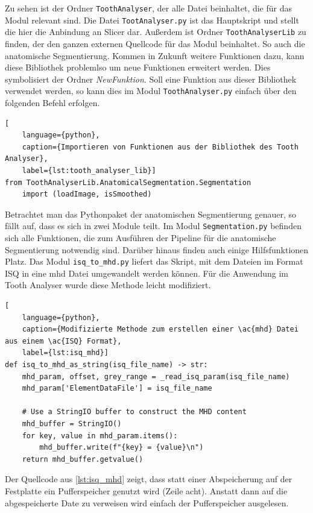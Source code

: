 Zu sehen ist der Ordner \texttt{ToothAnalyser}, der alle Datei beinhaltet, die
für das Modul relevant sind. Die Datei \texttt{TootAnalyser.py} ist das
Hauptskript und stellt die hier die Anbindung an Slicer dar. Außerdem ist Ordner
\texttt{ToothAnalyserLib} zu finden, der den ganzen externen Quellcode für das Modul
beinhaltet. So auch die anatomische Segmentierung. Kommen in Zukunft weitere Funktionen
dazu, kann diese Bibliothek problemlso um neue Funktionen erweitert werden. Dies
symbolisiert der Ordner \textsl{NewFunktion}. Soll eine Funktion aus dieser Bibliothek
verwendet werden, so kann dies im Modul \texttt{ToothAnalyser.py} einfach über den
folgenden Befehl erfolgen.

\begin{lstlisting}[
    language={python},
    caption={Importieren von Funktionen aus der Bibliothek des Tooth Analyser},
    label={lst:tooth_analyser_lib}]
from ToothAnalyserLib.AnatomicalSegmentation.Segmentation
	import (loadImage, isSmoothed)
\end{lstlisting}

Betrachtet man das Pythonpaket der anatomischen Segmentierung genauer, so fällt auf,
dass es sich in zwei Module teilt. Im Modul \texttt{Segmentation.py} befinden
sich alle Funktionen, die zum Ausführen der Pipeline für die anatomische Segmentierung
notwendig sind. Darüber hinaus finden auch einige Hilfsfunktionen Platz. Das Modul
\texttt{isq\_to\_mhd.py} liefert das Skript, mit dem Dateien im Format \ac{ISQ}
in eine \ac{mhd} Datei umgewandelt werden können. Für die Anwendung im Tooth
Analyser wurde diese Methode leicht modifiziert.

\begin{lstlisting}[
    language={python},
    caption={Modifizierte Methode zum erstellen einer \ac{mhd} Datei aus einem \ac{ISQ} Format},
    label={lst:isq_mhd}]
def isq_to_mhd_as_string(isq_file_name) -> str:
    mhd_param, offset, grey_range = _read_isq_param(isq_file_name)
    mhd_param['ElementDataFile'] = isq_file_name

    # Use a StringIO buffer to construct the MHD content
    mhd_buffer = StringIO()
    for key, value in mhd_param.items():
        mhd_buffer.write(f"{key} = {value}\n")
    return mhd_buffer.getvalue()
\end{lstlisting}

Der Quellcode aus \ref{lst:isq_mhd} zeigt, dass statt einer Abspeicherung auf
der Festplatte ein Pufferspeicher genutzt wird (Zeile acht). Anstatt dann auf die
abgespeicherte Date zu verweisen wird einfach der Pufferspeicher ausgelesen.

